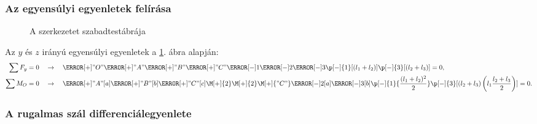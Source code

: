\subsubsection{Az egyensúlyi egyenletek felírása}


\begin{figure}[H]
  \centering
  
  \vspace{-2mm}
  \caption{A szerkezetet szabadtestábrája}
  \label{fig:szta}
\end{figure}
\pagebreak

Az $y$ és $z$ irányú egyensúlyi egyenletek a \ref{fig:szta}. ábra alapján:
\begin{align}
  \sum F_y = 0 \quad & \rightarrow \quad
  \F[+]{"O"}
  \F[+]{"A"}
  \F[+]{"B"}
  \F[+]{"C"}
  \F[-]{1}
  \F[-]{2}
  \F[-]{3}
  \p[-]{1}[(l_1 + l_2)]
  \p[-]{3}[(l_2 + l_3)]
  = 0
  \text,
  \\
  \sum M_O = 0 \quad & \rightarrow \quad
  \F[+]{"A"}[a]
  \F[+]{"B"}[b]
  \F[+]{"C"}[c]
  \M[+]{2}
  \M[+]{2}
  \M[+]{"C"}
  \F[-]{2}[a]
  \F[-]{3}[b]
  \p[-]{1}{\frac{(l_1 + l_2)^2}{2}}
  \p[-]{3}[(l_2 + l_3)\left( l_1 \frac{l_2 + l_3}{2} \right)]
  = 0
  \text.
\end{align}

\subsubsection{A rugalmas szál differenciálegyenlete}

